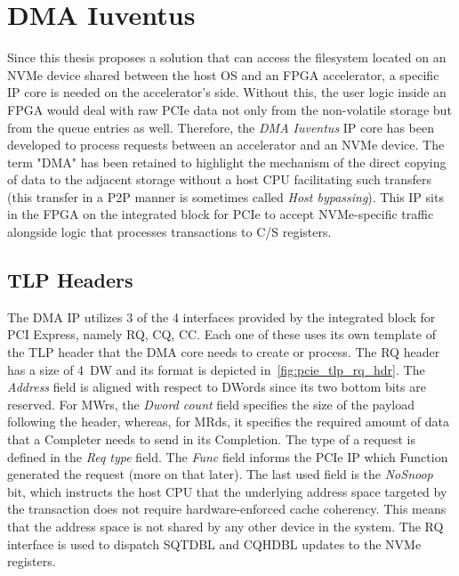 \chapter{DMA Iuventus}
\label{chap:dma_iuventus}

Since this thesis proposes a solution that can access the filesystem located on an NVMe device
shared between the host OS and an FPGA accelerator, a specific IP core is needed on the
accelerator's side. Without this, the user logic inside an FPGA would deal with raw PCIe data not
only from the non-volatile storage but from the queue entries as well. Therefore, the \emph{DMA
Iuventus} IP core has been developed to process requests between an accelerator and an NVMe
device\cite{iuventus_github}. The term "DMA" has been retained to highlight the mechanism of the
direct copying of data to the adjacent storage without a host CPU facilitating such transfers (this
transfer in a \ac{P2P} manner is sometimes called \emph{Host bypassing}). This IP sits in the FPGA
on the integrated block for PCIe to accept NVMe-specific traffic alongside logic that processes
transactions to \ac{C/S} registers\footnotemark.


\section{TLP Headers}

The DMA IP utilizes 3 of the 4 interfaces provided by the integrated block for PCI Express, namely
\ac{RQ}, \ac{CQ}, \ac{CC}. Each one of these uses its own template of the TLP header that the DMA
core needs to create or process. The \ac{RQ} header has a size of 4~DW and its format is depicted
in~\cref{fig:pcie_tlp_rq_hdr}. The \emph{Address} field is aligned with respect to DWords since its
two bottom bits are reserved\footnotemark. For \acp{MWr}, the \emph{Dword count} field specifies the
size of the payload following the header, whereas, for \acp{MRd}, it specifies the required amount
of data that a Completer needs to send in its Completion. The type of a request is defined in the
\emph{Req type} field. The \emph{Func} field informs the PCIe IP which Function generated the
request (more on that later)\cite{pcie_amd_ip}. The last used field is the \emph{NoSnoop} bit, which
instructs the host CPU that the underlying address space targeted by the transaction does not
require hardware-enforced cache coherency\cite{pcie_spec}. This means that the address space is not
shared by any other device in the system. The \ac{RQ} interface is used to dispatch \ac{SQTDBL} and
\ac{CQHDBL} updates to the NVMe registers.

